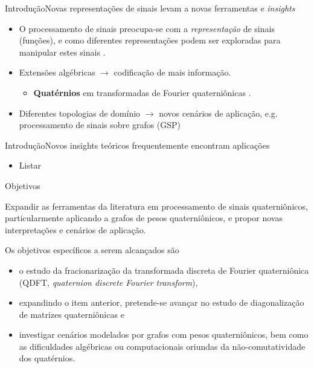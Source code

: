 \documentclass[10pt,compress]{beamer}
\newcommand{\red}[1]{{\color{red}#1}}
\newcommand{\colorcite}[1]{{\color{mygray}#1}}
\begin{document}
\begin{frame}{Introdu\c c\~ao}{Novas representa\c c\~oes de sinais levam a novas ferramentas e \emph{insights}}
\begin{itemize}
\item O processamento de sinais preocupa-se com a \emph{representa\c c\~ao} de  sinais (fun\c c\~oes), e como diferentes representa\c c\~oes podem ser exploradas para manipular estes sinais \colorcite{\cite{oppenheim1999discrete, rabiner2010theory, graf2015features, vergin1999generalized}}.

\item Extens\~oes alg\'ebricas $ \rightarrow $ codifica\c c\~ao de mais informa\c c\~ao.

\begin{itemize}

\item \textbf{Quat\'ernios} em transformadas de Fourier quaterni\^onicas \colorcite{\cite{sangwine1996fourier, ell1993quaternion}}.
\end{itemize}

\item Diferentes topologias de dom\'inio $ \rightarrow $ novos cen\'arios de aplica\c c\~ao, e.g. processamento de sinais sobre grafos (GSP)
\end{itemize}
\end{frame}

\begin{frame}{Introdu\c c\~ao}{Novos insights te\'oricos frequentemente encontram aplica\c c\~oes}
\begin{itemize}
\item \red{Listar}
\end{itemize}
\end{frame}

\begin{frame}{Objetivos}
\begin{block}{}
Expandir as ferramentas da literatura em processamento de sinais quaterni\^onicos, particularmente aplicando a grafos de pesos quaterni\^onicos, e propor novas interpreta\c c\~oes e cen\'arios de aplica\c c\~ao.
\end{block}
\pause

Os objetivos espec\'ificos a serem alcan\c cados s\~ao
\begin{itemize}
\item o estudo da fracionariza\c c\~ao da transformada discreta de Fourier quaterni\^onica (QDFT, \emph{quaternion discrete Fourier transform}),
\item expandindo o item anterior, pretende-se avan\c car no estudo de diagonaliza\c c\~ao de matrizes quaterni\^onicas e
\item investigar cen\'arios modelados por grafos com pesos quaterni\^onicos, bem como as dificuldades alg\'ebricas ou computacionais oriundas da n\~ao-comutatividade dos quat\'ernios.
\end{itemize}
\end{frame}
\end{document}
